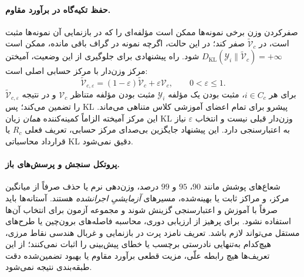\paragraph{حفظ تکیه‌گاه در برآورد مقاوم.}
صفرکردن وزن برخی نمونه‌ها ممکن است مؤلفه‌ای
را که در بازنمایی آن نمونه‌ها مثبت است،
در $\widetilde{\mathcal V}_c$ صفر کند؛
در این حالت، اگرچه نمونه در گراف باقی مانده،
ممکن است
$D_{\mathrm{KL}}(\mathscr Y_i\|
\widetilde{\mathcal V}_c)=+\infty$
شود. راه پیشنهادی برای جلوگیری از این وضعیت،
آمیختن مرکز وزن‌دار با مرکز حسابی اصلی است:
\begin{equation}\label{eq:ch3-outlier-support-preserving-center}
\widetilde{\mathcal V}_{c,\varepsilon}
=(1-\varepsilon)\widetilde{\mathcal V}_c
+\varepsilon\mathcal V_c,\qquad
0<\varepsilon\le1.
\end{equation}
برای هر $i\in C_c$، مثبت بودن یک مؤلفه
$\mathscr Y_i$ مثبت بودن مؤلفه متناظر
$\mathcal V_c$ و در نتیجه
$\widetilde{\mathcal V}_{c,\varepsilon}$
را تضمین می‌کند؛ پس KL پیشرو
برای تمام اعضای آموزشی کلاس متناهی می‌ماند.
این مرکز آمیخته الزاماً کمینه‌کننده
\emph{همان} زیان KL وزن‌دار قبلی نیست
و انتخاب $\varepsilon$ نیاز به اعتبارسنجی دارد.
این پیشنهاد جایگزین بی‌صدای
مرکز حسابی، تعریف فعلی $R_c$ یا قرارداد
محاسباتی KL دقیق نمی‌شود.

\paragraph{پروتکل سنجش و پرسش‌های باز.}
شعاع‌های پوشش مانند $90$، $95$ و $99$ درصد،
وزن‌دهی نرم یا حذف صرفاً از میانگین مرکز،
و مراکز ثابت یا بهینه‌شده، مسیرهای
\emph{آزمایشیِ اجرا‌نشده} هستند.
آستانه‌ها باید صرفاً با آموزش و اعتبارسنجی
گزینش شوند و مجموعه آزمون برای انتخاب آن‌ها
استفاده نشود. برای پرهیز از ارزیابی دوری،
محاسبه فاصله‌های برون‌چین یا طرح‌های مستقل
می‌تواند لازم باشد.
تعریف نامزد پرت در بازنمایی و غربال
هندسی نقاط مرزی، هیچ‌کدام به‌تنهایی
نادرستی برچسب یا خطای پیش‌بینی
را اثبات نمی‌کنند؛ از این تعریف‌ها
هیچ رابطه علّی، مزیت قطعی برآورد
مقاوم یا بهبود تضمین‌شده دقت
طبقه‌بندی نتیجه نمی‌شود.

\endgroup
